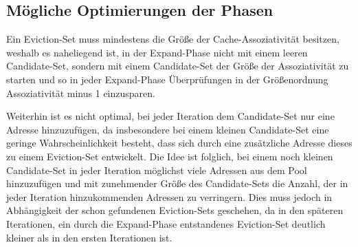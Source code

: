 




\subsection{Mögliche Optimierungen der Phasen}
\label{optESSearch}

Ein Eviction-Set muss mindestens die Größe der Cache-Assoziativität besitzen, weshalb es naheliegend ist, in der Expand-Phase nicht mit einem leeren Candidate-Set, sondern mit einem Candidate-Set der Größe der Assoziativität zu starten und so in jeder Expand-Phase Überprüfungen in der Größenordnung Assoziativität minus 1 einzusparen.

Weiterhin ist es nicht optimal, bei jeder Iteration dem Candidate-Set nur eine Adresse hinzuzufügen, da insbesondere bei einem kleinen Candidate-Set eine geringe Wahrscheinlichkeit besteht, dass sich durch eine zusätzliche Adresse dieses zu einem Eviction-Set entwickelt.
Die Idee ist folglich, bei einem noch kleinen Candidate-Set in jeder Iteration möglichst viele Adressen aus dem Pool hinzuzufügen und mit zunehmender Größe des Candidate-Sets die Anzahl, der in jeder Iteration hinzukommenden Adressen zu verringern.
Dies muss jedoch in Abhängigkeit der schon gefundenen Eviction-Sets geschehen, da in den späteren Iterationen, ein durch die Expand-Phase entstandenes Eviction-Set deutlich kleiner als in den ersten Iterationen ist.

